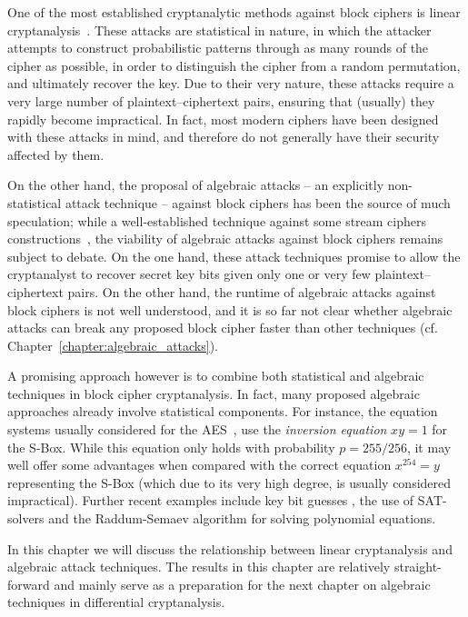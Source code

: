 One of the most established cryptanalytic methods against block ciphers is linear cryptanalysis~\cite{Matsui1993}. These attacks are statistical in nature, in which the attacker attempts to construct probabilistic patterns through as many rounds of the cipher as possible, in order to distinguish the cipher from a random permutation, and ultimately recover the key. Due to their very nature, these attacks require a very large number of plaintext--ciphertext pairs, ensuring that (usually) they rapidly become impractical. In fact, most modern ciphers have been designed with these attacks in mind, and therefore do not generally have their security affected by them.

On the other hand, the proposal of algebraic attacks -- an explicitly non-statistical attack technique -- against block ciphers has been the source of much speculation; while a well-established technique against some stream ciphers constructions~\cite{ars-faugere:inria2005,courtois-meier:eurocrypt2003}, the viability of algebraic attacks against block ciphers remains subject to debate. On the one hand, these attack techniques promise to allow the cryptanalyst to recover secret key bits given only one or very few plaintext--ciphertext pairs. On the other hand, the runtime of algebraic attacks against block ciphers is not well understood, and it is so far not clear whether algebraic attacks can break any proposed block cipher faster than other techniques (cf. Chapter~\ref{chapter:algebraic_attacks}).

A promising approach however is to combine both statistical and algebraic techniques in block cipher cryptanalysis. In fact, many proposed algebraic approaches already involve statistical components. For instance, the equation systems usually considered for the AES~\cite{murphy-robshaw:crypto2002,alg-aes-book}, use
the \emph{inversion equation} $xy = 1$ for the S-Box. While this equation only holds with probability $p = 255/256$, it may well offer some advantages when compared with the correct equation $x^{254} = y$ representing the S-Box (which due to its very high degree, is usually considered impractical). Further recent
examples include key bit guesses \cite{alg-des}, the use of SAT-solvers \cite{bard-phd} and the Raddum-Semaev algorithm \cite{Raddum2006} for solving polynomial equations.

In this chapter we will discuss the relationship between linear cryptanalysis and algebraic attack techniques. The results in this chapter are relatively straight-forward and mainly serve as a preparation for the next chapter on algebraic techniques in differential cryptanalysis.

